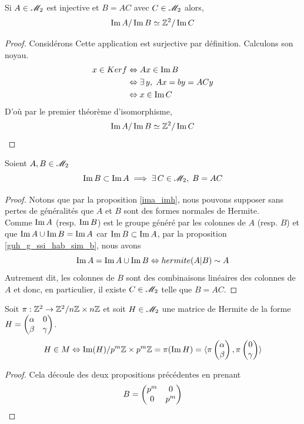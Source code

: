 \documentclass[12pt]{article}
\newcommand*{\pmZpmZ }{p^m\Z \x p^m\Z}
\newcommand*{\ZZnZ}{\Z^2/\nZnZ}
\newcommand{\nZnZ}{n\Z \x n\Z}
\begin{document}
\begin{proposition}
	Si $A \in  \mathscr{M}_2$ est injective et $B = AC$ avec $C \in \mathscr{M}_2$ alors,
	$$\operatorname{Im} A/\operatorname{Im} B  \simeq \mathbb Z^2/\operatorname{Im} C$$
\end{proposition}

\begin{proof}
	Considérons 
	Cette application est surjective par définition. Calculons son noyau.
	\begin{equation*}
		\begin{aligned}
			x \in Ker f & \Leftrightarrow Ax \in \operatorname{Im} B             \\
			            & \Leftrightarrow \exists \, y , \; Ax = by = ACy \\
			            & \Leftrightarrow x \in \operatorname{Im} C
		\end{aligned}
	\end{equation*}
	D'où par le premier théorème d'isomorphisme,
	$$\operatorname{Im} A/\operatorname{Im} B  \simeq \mathbb Z^2/\operatorname{Im} C$$
\end{proof}
\newpage

\begin{proposition}
	Soient $A,B \in \mathscr{M}_2$
	$$\operatorname{Im} B \subset \operatorname{Im} A \implies \exists \, C \in \mathscr{M}_2 , \; B = AC$$
\end{proposition}

\begin{proof}
	Notons que par la proposition \ref{ima_imh}, nous pouvons supposer sans pertes de généralités que $A$ et $B$
	sont des formes normales de Hermite.\\
	Comme $\operatorname{Im} A$ (resp. $\operatorname{Im} B$) est le groupe généré par les colonnes de $A$ (resp. $B$)
	et que $\operatorname{Im} A \cup \operatorname{Im} B = \operatorname{Im} A$ car $\operatorname{Im} B \subset \operatorname{Im} A$,
	par la proposition \ref{guh_g_ssi_hab_sim_b}, nous avons
	$$\operatorname{Im} A = \operatorname{Im} A \cup \operatorname{Im} B \Leftrightarrow hermite (A|B) \sim A$$
	Autrement dit, les colonnes de $B$ sont des combinaisons linéaires des colonnes de $A$ et
	donc, en particulier, il existe $C \in \mathscr{M}_2$ telle que $B = AC$.

\end{proof}

\begin{proposition}\label{pi_imh}
	Soit $\sapp{\pi}{\Z^2}{\ZZnZ}$ et soit $H \in \mathscr{M}_2$ une matrice de Hermite de la forme
	$ H = \begin{pmatrix} \alpha & 0\\ \beta & \gamma \end{pmatrix}$.
	$$H \in M \ssi \im(H)/\pmZpmZ = \pi(\im H) =
		\gen{\pi\vectcolsqr{\alpha}{\beta}, \pi\vectcolsqr{0}{\gamma}}$$
\end{proposition}

\begin{proof}
	Cela découle des deux propositions précédentes en prenant $$B = \begin{pmatrix} p^m & 0\\ 0 & p^m \end{pmatrix}$$

\end{proof}
\end{document}
